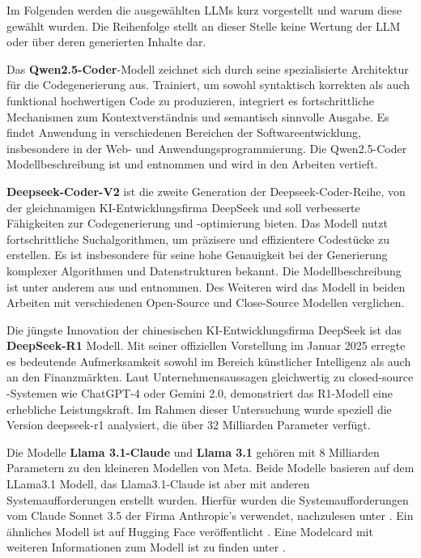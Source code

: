 Im Folgenden werden die ausgewählten LLMs kurz vorgestellt und warum diese gewählt wurden. Die Reihenfolge stellt an dieser Stelle keine Wertung der LLM oder über deren generierten Inhalte dar.\vspace{0.2cm}

Das \textbf{Qwen2.5-Coder}-Modell zeichnet sich durch seine spezialisierte Architektur für die Codegenerierung aus. Trainiert, um sowohl syntaktisch korrekten als auch funktional hochwertigen Code zu produzieren, integriert es fortschrittliche Mechanismen zum Kontextverständnis und semantisch sinnvolle Ausgabe. Es findet Anwendung in verschiedenen Bereichen der Softwareentwicklung, insbesondere in der Web- und Anwendungsprogrammierung. Die Qwen2.5-Coder Modellbeschreibung ist \cite{qwen-2024} und \cite{hui-2024} entnommen und wird in den Arbeiten vertieft.\vspace{0.2cm}

\textbf{Deepseek-Coder-V2} ist die zweite Generation der Deepseek-Coder-Reihe, von der gleichnamigen KI-Entwicklungsfirma DeepSeek und soll verbesserte Fähigkeiten zur Codegenerierung und -optimierung bieten. Das Modell nutzt fortschrittliche Suchalgorithmen, um präzisere und effizientere Codestücke zu erstellen. Es ist insbesondere für seine hohe Genauigkeit bei der Generierung komplexer Algorithmen und Datenstrukturen bekannt. Die Modellbeschreibung ist unter anderem aus \cite{deepseek-ai-2024} und \cite{cui-2024} entnommen. Des Weiteren wird das Modell in beiden Arbeiten mit verschiedenen Open-Source und Close-Source Modellen verglichen.\vspace{0.2cm} 

Die jüngste Innovation der chinesischen KI-Entwicklungsfirma DeepSeek ist das \textbf{DeepSeek-R1} Modell. Mit seiner offiziellen Vorstellung im Januar 2025 erregte es bedeutende Aufmerksamkeit sowohl im Bereich künstlicher Intelligenz als auch an den Finanzmärkten. Laut Unternehmensaussagen gleichwertig zu closed-source -Systemen wie ChatGPT-4 oder Gemini 2.0, demonstriert das R1-Modell eine erhebliche Leistungskraft. Im Rahmen dieser Untersuchung wurde speziell die Version deepseek-r1 analysiert, die über 32 Milliarden Parameter verfügt.\vspace{0.2cm}

Die Modelle \textbf{Llama 3.1-Claude} und \textbf{Llama 3.1} gehören mit 8 Milliarden Parametern zu den kleineren Modellen von Meta. Beide Modelle basieren auf dem LLama3.1 Modell, das Llama3.1-Claude ist aber mit anderen Systemaufforderungen erstellt wurden. Hierfür wurden die Systemaufforderungen vom Claude Sonnet 3.5 der Firma Anthropic’s verwendet, nachzulesen unter \cite{ollama_page_llama31_claude}. Ein ähnliches Modell ist auf Hugging Face veröffentlicht \cite{huggingface_page_llama31_claude}. Eine Modelcard mit weiteren Informationen zum Modell ist zu finden unter \cite{meta-llama-no-date}.\vspace{0.2cm}

